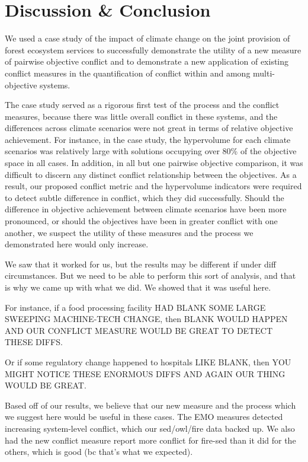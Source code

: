 \section{Discussion \& Conclusion}
We used a case study of the impact of climate change on the joint provision of forest ecosystem services to successfully demonstrate the utility of a new measure of pairwise objective conflict and to demonstrate a new application of existing conflict measures in the quantification of conflict within and among multi-objective systems.

The case study served as a rigorous first test of the process and the conflict measures, because there was little overall conflict in these systems, and the differences across climate scenarios were not great in terms of relative objective achievement. For instance, in the case study, the hypervolume for each climate scenarios was relatively large with solutions occupying over 80\% of the objective space in all cases. In addition, in all but one pairwise objective comparison, it was difficult to discern any distinct conflict relationship between the objectives. As a result, our proposed conflict metric and the hypervolume indicators were required to detect subtle difference in conflict, which they did successfully. Should the difference in objective achievement between climate scenarios have been more pronounced, or should the objectives have been in greater conflict with one another, we suspect the utility of these measures and the process we demonstrated here would only increase.

We saw that it worked for us, but the results may be different if under diff circumstances. But we need to be able to perform this sort of analysis, and that is why we came up with what we did. We showed that it was useful here.

For instance, if a food processing facility HAD BLANK SOME LARGE SWEEPING MACHINE-TECH CHANGE, then BLANK WOULD HAPPEN AND OUR CONFLICT MEASURE WOULD BE GREAT TO DETECT THESE DIFFS.

Or if some regulatory change happened to hospitals LIKE BLANK, then YOU MIGHT NOTICE THESE ENORMOUS DIFFS AND AGAIN OUR THING WOULD BE GREAT.

Based off of our results, we believe that our new measure and the process which we suggest here would be useful in these cases. The EMO measures detected increasing system-level conflict, which our sed/owl/fire data backed up. We also had the new conflict measure report more conflict for fire-sed than it did for the others, which is good (bc that's what we expected).

